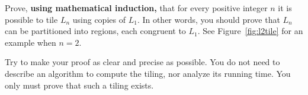 \documentclass[12pt]{article}
\def\bigap{0.25in}
\begin{document}
\noindent
Prove, {\bf using mathematical induction,} that for every positive integer $n$ 
it is possible to tile $L_n$ using 
copies of $L_1$. In other words, you should
prove that $L_n$ can be partitioned into 
regions, each congruent to $L_1$.
See Figure~\ref{fig:l2tile} for an 
example when $n=2$.

Try to make your proof as clear and precise as 
possible. You do not need to 
describe an algorithm to compute the tiling, nor 
analyze its running time. You only must prove 
that such a tiling exists.

\vskip \bigap

\end{document}
